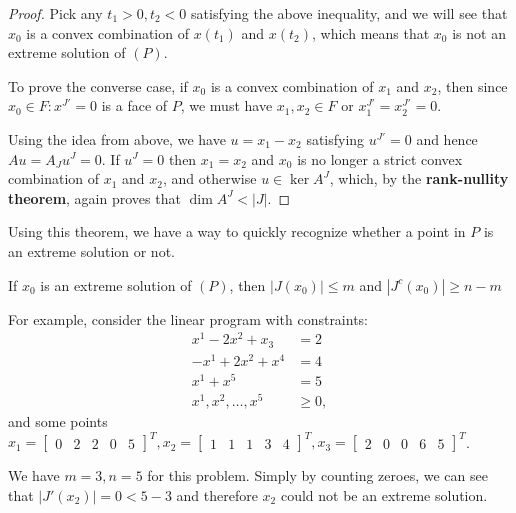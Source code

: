 \begin{proof}
  Pick any \( t_{1} > 0, t_{2} < 0 \) satisfying the above inequality, and we
  will see that \( x_{0} \) is a convex combination of \( x(t_{1}) \) and \(
  x(t_{2}) \), which means that \( x_{0} \) is not an extreme solution of \( (P) \).

  To prove the converse case, if \( x_{0} \) is a convex combination of \( x_{1}
  \) and \( x_{2} \), then since \( x_{0} \in F: x^{J'} = 0   \) is a face of \(
  P\), we must have \( x_{1}, x_{2} \in F \) or \( x_{1}^{J'} = x_{2}^{J'} = 0 \).

  Using the idea from above, we have \( u = x_{1} - x_{2} \) satisfying \(
  u^{J'} = 0 \) and hence \( Au = A_{J}u^{J} = 0 \). If \( u^{J} = 0 \) then \(
  x_{1} = x_{2}\) and \( x_{0} \) is no longer a strict convex combination of \(
  x_{1}\) and \( x_{2} \), and otherwise \( u \in \operatorname{ker} A^{J} \),
  which, by the \textbf{rank-nullity theorem}, again proves that \( \dim A^{J} <
  |J|\).
\end{proof}

Using this theorem, we have a way to quickly recognize whether a point in \( P
\) is an extreme solution or not.

\begin{corollary}
\label{cor:Number of zeroes in extreme solutions}
If \( x_{0} \) is an extreme solution of \( (P) \), then \( |J(x_{0})| \le  m \)
and \( |J^{c}(x_{0})| \ge  n - m \)
\end{corollary}

For example, consider the linear program with constraints:
\begin{align*}
  x^{1} - 2x^{2} + x_{3} &=  2 \\
  -x^{1} + 2x^{2} + x^{4} &= 4 \\
  x^{1} + x^{5} &=  5 \\
  x^{1},x^{2}, \ldots , x^{5} &\ge 0,
  \end{align*} and some points \( x_{1} = \begin{bmatrix} 0 & 2 & 2 & 0 & 5
  \end{bmatrix}^{T}, x_{2} = \begin{bmatrix} 1 & 1 & 1 & 3 & 4
  \end{bmatrix}^{T}, x_{3} = \begin{bmatrix} 2 & 0 & 0 & 6 & 5 \end{bmatrix}^{T}
  \).

  We have \( m = 3, n = 5 \) for this problem. Simply by counting zeroes, we can
  see that \( |J'(x_{2})| = 0 < 5 - 3 \) and therefore \( x_{2} \) could not be an
  extreme solution.

